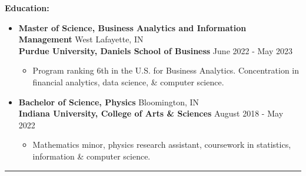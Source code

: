 \documentclass[letterpaper]{cream_class}
\begin{document}
\noindent\textcolor{burgundy}{\noindent\textbf{\large Education:}\\[-3ex]}
\begin{itemize}[noitemsep, leftmargin=*]
  \item {\large\textbf{Master of Science, Business Analytics and Information Management}} \hfill West Lafayette, IN \\
        \textbf{Purdue University, Daniels School of Business} \hfill June 2022 - May 2023
    \begin{itemize}[noitemsep, leftmargin=*]
      \item Program ranking 6th in the U.S. for Business Analytics. Concentration in financial analytics, data science, \& computer science.
    \end{itemize}
  \item {\large\textbf{Bachelor of Science, Physics}} \hfill Bloomington, IN \\
        \textbf{Indiana University, College of Arts \& Sciences} \hfill August 2018 - May 2022
    \begin{itemize}[noitemsep, leftmargin=*]
      \item Mathematics minor, physics research assistant, coursework in statistics, information \& computer science.
    \end{itemize}
\end{itemize}
\hrule
\vspace{6pt}
\end{document}
